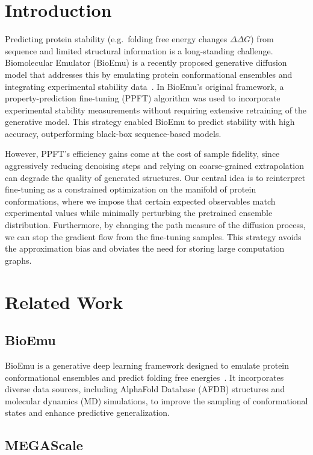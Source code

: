 \documentclass{article}
\theoremstyle{plain}
\theoremstyle{definition}
\theoremstyle{remark}
\begin{document}
\section{Introduction}

Predicting protein stability (e.g.\ folding free energy changes $\Delta\Delta G$) from sequence and limited structural information is a long-standing challenge. Biomolecular Emulator (BioEmu) is a recently proposed generative diffusion model that addresses this by emulating protein conformational ensembles and integrating experimental stability data~\cite{bioemu}. In BioEmu's original framework, a property-prediction fine-tuning (PPFT) algorithm was used to incorporate experimental stability measurements without requiring extensive retraining of the generative model. This strategy enabled BioEmu to predict stability with high accuracy, outperforming black-box sequence-based models.

However, PPFT's efficiency gains come at the cost of sample fidelity, since aggressively reducing denoising steps and relying on coarse-grained extrapolation can degrade the quality of generated structures. Our central idea is to reinterpret fine-tuning as a constrained optimization on the manifold of protein conformations, where we impose that certain expected observables match experimental values while minimally perturbing the pretrained ensemble distribution. Furthermore, by changing the path measure of the diffusion process, we can stop the gradient flow from the fine-tuning samples. This strategy avoids the approximation bias and obviates the need for storing large computation graphs.

\section{Related Work}

\subsection{BioEmu}

BioEmu is a generative deep learning framework designed to emulate protein conformational ensembles and predict folding free energies~\cite{bioemu}. It incorporates diverse data sources, including AlphaFold Database (AFDB) structures and molecular dynamics (MD) simulations, to improve the sampling of conformational states and enhance predictive generalization.

\subsection{MEGAScale}
\end{document}
